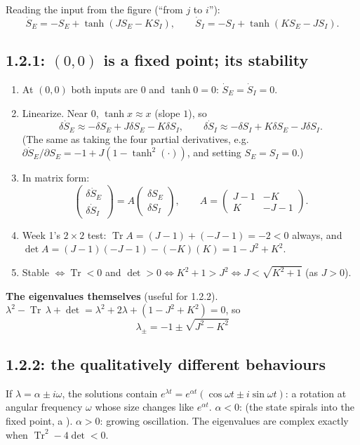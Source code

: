 Reading the input from the figure (``from $j$ to $i$''):
\[ \dot S_E=-S_E+\tanh(JS_E-KS_I),\qquad \dot S_I=-S_I+\tanh(KS_E-JS_I). \]

\subsection*{1.2.1: $(0,0)$ is a fixed point; its stability}
\begin{enumerate}
  \item At $(0,0)$ both inputs are $0$ and $\tanh0=0$: $\dot S_E=\dot S_I=0$. \checkmark
  \item Linearize. Near $0$, $\tanh x\approx x$ (slope $1$), so
        \[ \dot{\delta S_E}\approx-\delta S_E+J\delta S_E-K\delta S_I,\qquad \dot{\delta S_I}\approx-\delta S_I+K\delta S_E-J\delta S_I. \]
        (The same as taking the four partial derivatives, e.g.\ $\partial\dot S_E/\partial S_E=-1+J(1-\tanh^2(\cdot))$, and setting $S_E=S_I=0$.)
  \item In matrix form:
        \[ \begin{pmatrix}\dot{\delta S_E}\\\dot{\delta S_I}\end{pmatrix}=A\begin{pmatrix}\delta S_E\\\delta S_I\end{pmatrix},\qquad A=\begin{pmatrix}J-1&-K\\K&-J-1\end{pmatrix}. \]
  \item Week 1's $2\times2$ test: $\operatorname{Tr}A=(J-1)+(-J-1)=-2<0$ always, and
        $\det A=(J-1)(-J-1)-(-K)(K)=1-J^2+K^2$.
  \item Stable $\iff\operatorname{Tr}<0$ and $\det>0\iff K^2+1>J^2\iff\boxed{J<\sqrt{K^2+1}}$ (as $J>0$).
\end{enumerate}

\textbf{The eigenvalues themselves} (useful for 1.2.2). $\lambda^2-\operatorname{Tr}\,\lambda+\det=\lambda^2+2\lambda+(1-J^2+K^2)=0$, so
\[ \boxed{\ \lambda_\pm=-1\pm\sqrt{J^2-K^2}\ } \]

\subsection*{1.2.2: the qualitatively different behaviours}

\begin{defn}
If $\lambda=\alpha\pm i\omega$, the solutions contain $e^{\lambda t}=e^{\alpha t}(\cos\omega t\pm i\sin\omega t)$: a rotation at angular frequency $\omega$ whose size changes like $e^{\alpha t}$.
$\alpha<0$:  (the state spirals into the fixed point, a ). $\alpha>0$: growing oscillation.
The eigenvalues are complex exactly when $\operatorname{Tr}^2-4\det<0$.
\end{defn}

